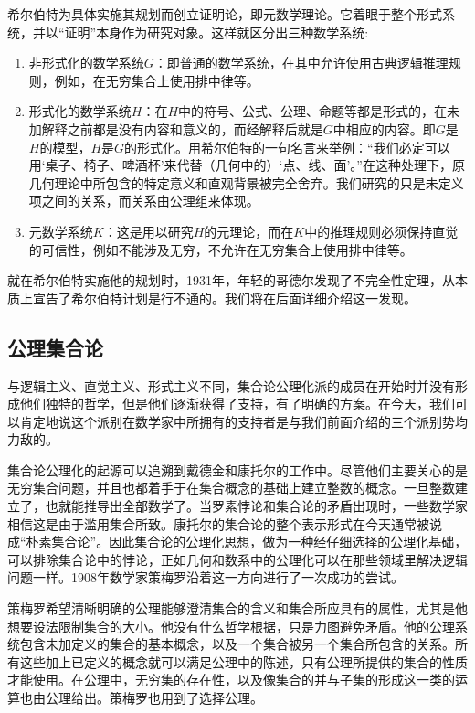 \documentclass[b5paper]{ctexart}
\begin{document}
希尔伯特为具体实施其规划而创立证明论，即元数学理论。它着眼于整个形式系统，并以“证明”本身作为研究对象。这样就区分出三种数学系统:
\begin{enumerate}
\item 非形式化的数学系统$G$：即普通的数学系统，在其中允许使用古典逻辑推理规则，例如，在无穷集合上使用排中律等。
\item 形式化的数学系统$H$：在$H$中的符号、公式、公理、命题等都是形式的，在未加解释之前都是没有内容和意义的，而经解释后就是$G$中相应的内容。即$G$是$H$的模型，$H$是$G$的形式化。用希尔伯特的一句名言来举例：“我们必定可以用‘桌子、椅子、啤酒杯’来代替（几何中的）‘点、线、面’。”在这种处理下，原几何理论中所包含的特定意义和直观背景被完全舍弃。我们研究的只是未定义项之间的关系，而关系由公理组来体现。
\item 元数学系统$K$：这是用以研究$H$的元理论，而在$K$中的推理规则必须保持直觉的可信性，例如不能涉及无穷，不允许在无穷集合上使用排中律等。
\end{enumerate}

就在希尔伯特实施他的规划时，1931年，年轻的哥德尔发现了不完全性定理，从本质上宣告了希尔伯特计划是行不通的。我们将在后面详细介绍这一发现。

\subsection{公理集合论}

与逻辑主义、直觉主义、形式主义不同，集合论公理化派的成员在开始时并没有形成他们独特的哲学，但是他们逐渐获得了支持，有了明确的方案。在今天，我们可以肯定地说这个派别在数学家中所拥有的支持者是与我们前面介绍的三个派别势均力敌的。

集合论公理化的起源可以追溯到戴德金和康托尔的工作中。尽管他们主要关心的是无穷集合问题，并且也都着手于在集合概念的基础上建立整数的概念。一旦整数建立了，也就能推导出全部数学了。当罗素悖论和集合论的矛盾出现时，一些数学家相信这是由于滥用集合所致。康托尔的集合论的整个表示形式在今天通常被说成“朴素集合论”。因此集合论的公理化思想，做为一种经仔细选择的公理化基础，可以排除集合论中的悖论，正如几何和数系中的公理化可以在那些领域里解决逻辑问题一样。1908年数学家策梅罗沿着这一方向进行了一次成功的尝试。

策梅罗希望清晰明确的公理能够澄清集合的含义和集合所应具有的属性，尤其是他想要设法限制集合的大小。他没有什么哲学根据，只是力图避免矛盾。他的公理系统包含未加定义的集合的基本概念，以及一个集合被另一个集合所包含的关系。所有这些加上已定义的概念就可以满足公理中的陈述，只有公理所提供的集合的性质才能使用。在公理中，无穷集的存在性，以及像集合的并与子集的形成这一类的运算也由公理给出。策梅罗也用到了选择公理。
\end{document}
